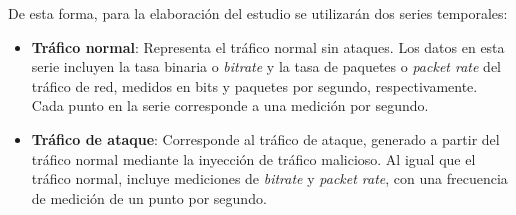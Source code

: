 De esta forma, para la elaboración del estudio se utilizarán dos series temporales: 
\begin{itemize}
    \item \textbf{Tráfico normal}: Representa el tráfico normal sin ataques. Los datos en esta serie incluyen la tasa binaria o \textit{bitrate} y la tasa de paquetes o \textit{packet rate} del tráfico de red, medidos en bits y paquetes por segundo, respectivamente. Cada punto en la serie corresponde a una medición por segundo.
    \item \textbf{Tráfico de ataque}: Corresponde al tráfico de ataque, generado a partir del tráfico normal mediante la inyección de tráfico malicioso. Al igual que el tráfico normal, incluye mediciones de \textit{bitrate} y \textit{packet rate}, con una frecuencia de medición de un punto por segundo.
\end{itemize}


